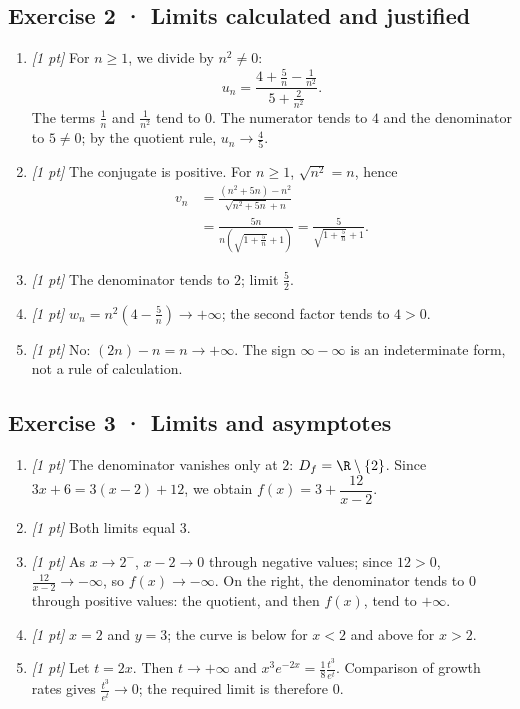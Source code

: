 \subsection*{Exercise 2 · Limits calculated and justified}\begin{enumerate}

\item \textit{[1 pt]} For $n\ge1$, we divide by $n^2\ne0$:
\[u_n=\frac{4+\frac{5}{n}-\frac{1}{n^2}}{5+\frac{2}{n^2}}.\]
The terms $\frac{1}{n}$ and $\frac{1}{n^2}$ tend to $0$. The numerator tends to $4$ and the denominator to $5\ne0$; by the quotient rule, $u_n\to\frac{4}{5}$.

\item \textit{[1 pt]} The conjugate is positive. For $n\ge1$, $\sqrt{n^2}=n$, hence
\[\begin{aligned}v_n&=\frac{(n^2+5n)-n^2}{\sqrt{n^2+5n}+n}\\&=\frac{5n}{n(\sqrt{1+\frac{5}{n}}+1)}=\frac{5}{\sqrt{1+\frac{5}{n}}+1}.\end{aligned}\]

\item \textit{[1 pt]} The denominator tends to $2$; limit $\frac{5}{2}$.

\item \textit{[1 pt]} $w_n=n^2(4-\frac{5}{n})\to+\infty$; the second factor tends to $4>0$.

\item \textit{[1 pt]} No: $(2n)-n=n\to+\infty$. The sign $\infty-\infty$ is an indeterminate form, not a rule of calculation.

\end{enumerate}

\subsection*{Exercise 3 · Limits and asymptotes}\begin{enumerate}

\item \textit{[1 pt]} The denominator vanishes only at $2$: $D_f=\R\setminus\{2\}$. Since $3x+6=3(x-2)+12$, we obtain $f(x)=3+\dfrac{12}{x-2}$.

\item \textit{[1 pt]} Both limits equal $3$.

\item \textit{[1 pt]} As $x\to 2^-$, $x-2\to0$ through negative values; since $12>0$, $\frac{12}{x-2}\to-\infty$, so $f(x)\to-\infty$. On the right, the denominator tends to $0$ through positive values: the quotient, and then $f(x)$, tend to $+\infty$.

\item \textit{[1 pt]} $x=2$ and $y=3$; the curve is below for $x<2$ and above for $x>2$.

\item \textit{[1 pt]} Let $t=2x$. Then $t\to+\infty$ and $x^3e^{-2x}=\frac{1}{8}\frac{t^3}{e^t}$. Comparison of growth rates gives $\frac{t^3}{e^t}\to0$; the required limit is therefore $0$.

\end{enumerate}

